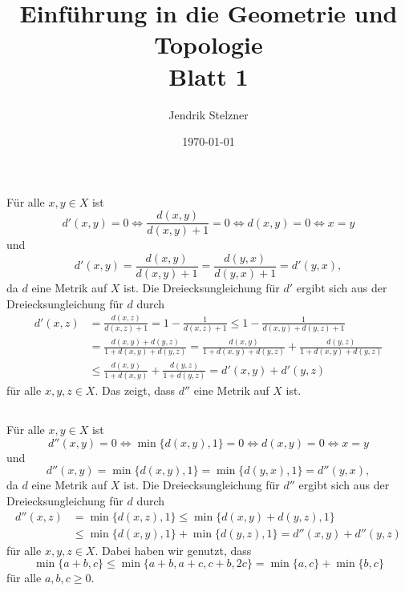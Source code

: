 \documentclass[a4paper,10pt]{article}
\title{\sc Einführung in die Geometrie und Topologie \\ \Large Blatt 1}
\author{Jendrik Stelzner}
\date{\today}
\begin{document}
\maketitle





\addtocounter{section}{3}





\section{}


\subsection{}
Für alle $x,y \in X$ ist
\[
 d'(x,y) = 0 \Leftrightarrow \frac{d(x,y)}{d(x,y)+1} = 0 \Leftrightarrow d(x,y) = 0 \Leftrightarrow x=y
\]
und
\[
 d'(x,y) = \frac{d(x,y)}{d(x,y)+1} = \frac{d(y,x)}{d(y,x)+1} = d'(y,x),
\]
da $d$ eine Metrik auf $X$ ist. Die Dreiecksungleichung für $d'$ ergibt sich aus der Dreiecksungleichung für $d$ durch
\begin{align*}
 d'(x,z)
 &= \frac{d(x,z)}{d(x,z)+1}
 = 1 - \frac{1}{d(x,z)+1}
 \leq 1 - \frac{1}{d(x,y)+d(y,z)+1} \\
 &= \frac{d(x,y)+d(y,z)}{1+d(x,y)+d(y,z)}
 = \frac{d(x,y)}{1+d(x,y)+d(y,z)} + \frac{d(y,z)}{1+d(x,y)+d(y,z)}\\
 &\leq \frac{d(x,y)}{1+d(x,y)} + \frac{d(y,z)}{1+d(y,z)}
 = d'(x,y) + d'(y,z)
\end{align*}
für alle $x,y,z \in X$. Das zeigt, dass $d''$ eine Metrik auf $X$ ist.


\subsection{}
Für alle $x,y \in X$ ist
\[
 d''(x,y) = 0
 \Leftrightarrow \min\{d(x,y),1\} = 0
 \Leftrightarrow d(x,y) = 0
 \Leftrightarrow x=y
\]
und
\[
 d''(x,y) = \min\{d(x,y),1\} = \min\{d(y,x),1\} = d''(y,x),
\]
da $d$ eine Metrik auf $X$ ist. Die Dreiecksungleichung für $d''$ ergibt sich aus der Dreiecksungleichung für $d$ durch
\begin{align*}
 d''(x,z)
 &= \min\{d(x,z),1\}
 \leq \min\{d(x,y)+d(y,z),1\} \\
 &\leq \min\{d(x,y),1\} + \min\{d(y,z),1\}
 = d''(x,y)+d''(y,z)
\end{align*}
für alle $x,y,z \in X$. Dabei haben wir genutzt, dass
\[
 \min\{a+b,c\} \leq \min\{a+b,a+c,c+b,2c\} = \min\{a,c\}+\min\{b,c\}
\]
für alle $a,b,c \geq 0$.
\end{document}
